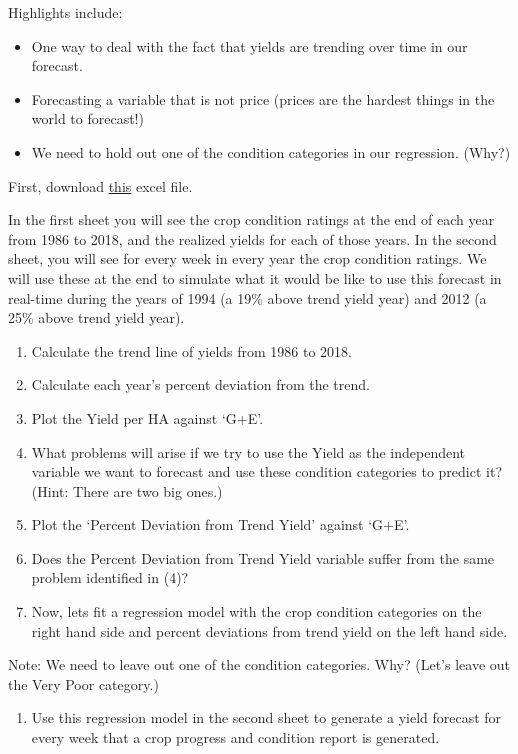 \documentclass[
  letterpaper,
  DIV=11,
  numbers=noendperiod]{scrreprt}
\providecommand{\tightlist}{%
  \setlength{\itemsep}{0pt}\setlength{\parskip}{0pt}}\usepackage{longtable,booktabs,array}
\begin{document}
Highlights include:

\begin{itemize}
\tightlist
\item
  One way to deal with the fact that yields are trending over time in
  our forecast.
\item
  Forecasting a variable that is not price (prices are the hardest
  things in the world to forecast!)
\item
  We need to hold out one of the condition categories in our regression.
  (Why?)
\end{itemize}

First, download \href{Excel-files/yied-forecast-advanced.xlsx}{this}
excel file.

In the first sheet you will see the crop condition ratings at the end of
each year from 1986 to 2018, and the realized yields for each of those
years. In the second sheet, you will see for every week in every year
the crop condition ratings. We will use these at the end to simulate
what it would be like to use this forecast in real-time during the years
of 1994 (a 19\% above trend yield year) and 2012 (a 25\% above trend
yield year).

\begin{enumerate}
\def\labelenumi{\arabic{enumi}.}
\tightlist
\item
  Calculate the trend line of yields from 1986 to 2018.
\item
  Calculate each year's percent deviation from the trend.
\item
  Plot the Yield per HA against `G+E'.
\item
  What problems will arise if we try to use the Yield as the independent
  variable we want to forecast and use these condition categories to
  predict it? (Hint: There are two big ones.)
\item
  Plot the `Percent Deviation from Trend Yield' against `G+E'.
\item
  Does the Percent Deviation from Trend Yield variable suffer from the
  same problem identified in (4)?
\item
  Now, lets fit a regression model with the crop condition categories on
  the right hand side and percent deviations from trend yield on the
  left hand side.
\end{enumerate}

Note: We need to leave out one of the condition categories. Why? (Let's
leave out the Very Poor category.)

\begin{enumerate}
\def\labelenumi{\arabic{enumi}.}
\setcounter{enumi}{7}
\tightlist
\item
  Use this regression model in the second sheet to generate a yield
  forecast for every week that a crop progress and condition report is
  generated.
\end{enumerate}
\end{document}
